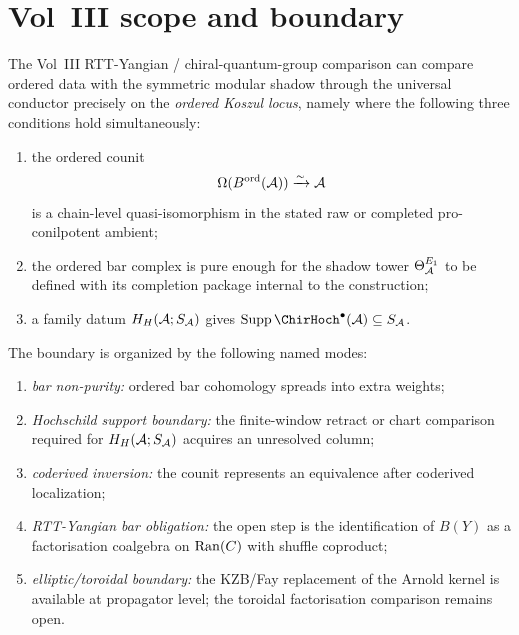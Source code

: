 \section{Vol~III scope and boundary}
\label{sec:uc-voliii-boundary}

\begin{theorem}
\label{thm:uc-K-Atiyah}
\ClaimStatusProvedHere
The Vol~III RTT-Yangian / chiral-quantum-group comparison can
compare ordered data with the symmetric modular shadow through the
universal conductor precisely on the \emph{ordered Koszul locus}, namely
where the following three conditions hold simultaneously:
\begin{enumerate}
\item[\textup{(K1)}] the ordered counit
 \[
 \Omega(B^{\mathrm{ord}}(\mathcal{A}))\xrightarrow{\sim}\mathcal{A}
 \]
 is a chain-level quasi-isomorphism in the stated raw or completed
 pro-conilpotent ambient;
\item[\textup{(K2)}] the ordered bar complex is pure enough for the
 shadow tower $\Theta^{E_1}_{\mathcal{A}}$ to be defined with its completion
 package internal to the construction;
\item[\textup{(K3)}] a family datum $H_H(\mathcal{A};S_{\mathcal{A}})$ gives
 $\operatorname{Supp}\ChirHoch^\bullet(\cA)\subseteq S_\cA$.
\end{enumerate}
The boundary is organized by the following named modes:
\begin{enumerate}
\item[\textup{(B1)}] \emph{bar non-purity:} ordered bar cohomology
 spreads into extra weights;
\item[\textup{(B2)}] \emph{Hochschild support boundary:}
 the finite-window retract or chart comparison required for
 $H_H(\mathcal{A};S_{\mathcal{A}})$ acquires an unresolved column;
\item[\textup{(B3)}] \emph{coderived inversion:} the counit represents
 an equivalence after coderived localization;
\item[\textup{(B4)}] \emph{RTT-Yangian bar obligation:} the open step
 is the identification of $B(Y)$ as a factorisation
 coalgebra on $\operatorname{Ran}(C)$ with shuffle coproduct;
\item[\textup{(B5)}] \emph{elliptic/toroidal boundary:} the KZB/Fay
 replacement of the Arnold kernel is available at propagator level;
 the toroidal factorisation comparison remains open.
\end{enumerate}
\end{theorem}

